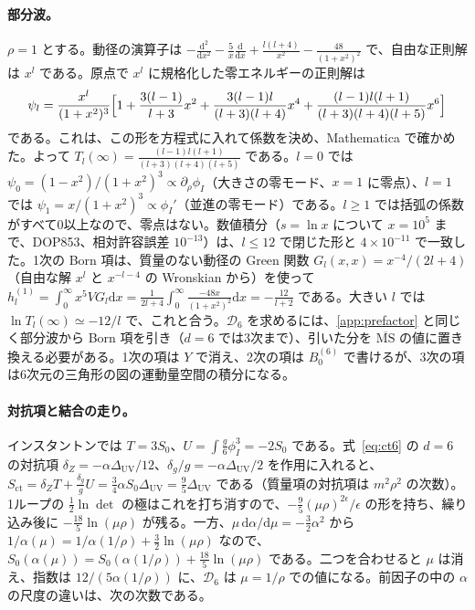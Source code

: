 \documentclass[a4paper,10pt]{ltjsarticle}
\newcommand{\dd}{\mathrm{d}}
\begin{document}
\paragraph{部分波。}$\rho=1$ とする。動径の演算子は $-\frac{\dd^2}{\dd x^2}-\frac5x\frac{\dd}{\dd x}+\frac{l(l+4)}{x^2}-\frac{48}{(1+x^2)^2}$ で、自由な正則解は $x^l$ である。原点で $x^l$ に規格化した零エネルギーの正則解は
\begin{equation*}
\psi_l=\frac{x^l}{(1+x^2)^3}\Bigl[1+\frac{3(l-1)}{l+3}x^2+\frac{3(l-1)l}{(l+3)(l+4)}x^4+\frac{(l-1)l(l+1)}{(l+3)(l+4)(l+5)}x^6\Bigr]
\end{equation*}
である。これは、この形を方程式に入れて係数を決め、Mathematica で確かめた。よって $T_l(\infty)=\frac{(l-1)l(l+1)}{(l+3)(l+4)(l+5)}$ である。$l=0$ では $\psi_0=(1-x^2)/(1+x^2)^3\propto\partial_\rho\phi_I$（大きさの零モード、$x=1$ に零点）、$l=1$ では $\psi_1=x/(1+x^2)^3\propto\phi_I'$（並進の零モード）である。$l\ge1$ では括弧の係数がすべて0以上なので、零点はない。数値積分（$s=\ln x$ について $x=10^5$ まで、DOP853、相対許容誤差 $10^{-13}$）は、$l\le12$ で閉じた形と $4\times10^{-11}$ で一致した。1次の Born 項は、質量のない動径の Green 関数 $G_l(x,x)=x^{-4}/(2l+4)$（自由な解 $x^l$ と $x^{-l-4}$ の Wronskian から）を使って $h_l^{(1)}=\int_0^\infty x^5VG_l\dd x=\frac{1}{2l+4}\int_0^\infty\frac{-48x}{(1+x^2)^2}\dd x=-\frac{12}{l+2}$ である。大きい $l$ では $\ln T_l(\infty)\simeq-12/l$ で、これと合う。$\mathcal D_6$ を求めるには、\ref{app:prefactor} と同じく部分波から Born 項を引き（$d=6$ では3次まで）、引いた分を $\overline{\mathrm{MS}}$ の値に置き換える必要がある。1次の項は $Y$ で消え、2次の項は $B_0^{(6)}$ で書けるが、3次の項は6次元の三角形の図の運動量空間の積分になる。

\paragraph{対抗項と結合の走り。}インスタントンでは $T=3S_0$、$U=\int\frac g6\phi_I^3=-2S_0$ である。式~\eqref{eq:ct6} の $d=6$ の対抗項 $\delta_Z=-\alpha\Delta_{\mathrm{UV}}/12$、$\delta_g/g=-\alpha\Delta_{\mathrm{UV}}/2$ を作用に入れると、$S_{\mathrm{ct}}=\delta_ZT+\frac{\delta_g}{g}U=\frac34\alpha S_0\Delta_{\mathrm{UV}}=\frac95\Delta_{\mathrm{UV}}$ である（質量項の対抗項は $m^2\rho^2$ の次数）。1ループの $\frac12\ln\det$ の極はこれを打ち消すので、$-\frac95(\mu\rho)^{2\epsilon}/\epsilon$ の形を持ち、繰り込み後に $-\frac{18}{5}\ln(\mu\rho)$ が残る。一方、$\mu\,\dd\alpha/\dd\mu=-\frac32\alpha^2$ から $1/\alpha(\mu)=1/\alpha(1/\rho)+\frac32\ln(\mu\rho)$ なので、$S_0(\alpha(\mu))=S_0(\alpha(1/\rho))+\frac{18}{5}\ln(\mu\rho)$ である。二つを合わせると $\mu$ は消え、指数は $12/(5\alpha(1/\rho))$ に、$\mathcal D_6$ は $\mu=1/\rho$ での値になる。前因子の中の $\alpha$ の尺度の違いは、次の次数である。
\end{document}
